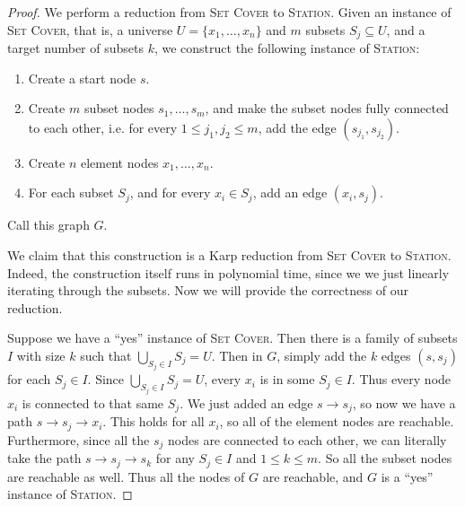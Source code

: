 \documentclass[10pt]{article}
\begin{document}
\begin{proof}
  We perform a reduction from \textsc{Set Cover} to \textsc{Station}. Given an instance of \textsc{Set Cover}, that is, a universe \(U = \{x_1, \ldots, x_n\}\) and \(m\) subsets \(S_j \subseteq U\), and a target number of subsets \(k\), we construct the following instance of \textsc{Station}: 
  \begin{enumerate}
    \item Create a start node \(s\).
    \item Create \(m\) subset nodes \(s_1, \ldots, s_m\), and make the subset nodes fully connected to each other, i.e. for every \(1 \leq j_1, j_2 \leq m\), add the edge \((s_{j_1}, s_{j_2})\).
    \item Create \(n\) element nodes \(x_1, \ldots, x_n\). 
    \item For each subset \(S_j\), and for every \(x_i \in S_j\), add an edge \((x_i, s_j)\).
  \end{enumerate}
  Call this graph \(G\).

  We claim that this construction is a Karp reduction from \textsc{Set Cover} to \textsc{Station}. Indeed, the construction itself runs in polynomial time, since we we just linearly iterating through the subsets. Now we will provide the correctness of our reduction.

  Suppose we have a ``yes'' instance of \textsc{Set Cover}. Then there is a family of subsets \(I\) with size \(k\) such that \(\bigcup_{S_j \in I} S_j = U\). Then in \(G\), simply add the \(k\) edges \((s, s_j)\) for each \(S_j \in I\). Since \(\bigcup_{S_j \in I} S_j = U\), every \(x_i\) is in some \(S_j \in I\). Thus every node \(x_i\) is connected to that same \(S_j\). We just added an edge \(s \to s_j\), so now we have a path \(s \to s_j \to x_i\). This holds for all \(x_i\), so all of the element nodes are reachable. Furthermore, since all the \(s_j\) nodes are connected to each other, we can literally take the path \(s \to s_j \to s_k\) for any \(S_j \in I\) and \(1 \leq k \leq m\). So all the subset nodes are reachable as well. Thus all the nodes of \(G\) are reachable, and \(G\) is a ``yes'' instance of \textsc{Station}. 


\end{proof}
\end{document}
